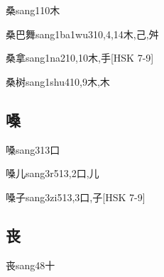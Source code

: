 \begin{EntryWithPhonetic}{桑}{sang1}{10}{⽊}
\end{EntryWithPhonetic}

\begin{EntryWithPhonetic}{桑巴舞}{sang1ba1wu3}{10,4,14}{⽊,⼰,⾇}
\end{EntryWithPhonetic}

\begin{EntryWithPhonetic}{桑拿}{sang1na2}{10,10}{⽊,⼿}[HSK 7-9]
\end{EntryWithPhonetic}

\begin{EntryWithPhonetic}{桑树}{sang1shu4}{10,9}{⽊,⽊}
\end{EntryWithPhonetic}

\subsection*{嗓}

\begin{EntryWithPhonetic}{嗓}{sang3}{13}{⼝}
\end{EntryWithPhonetic}

\begin{EntryWithPhonetic}{嗓儿}{sang3r5}{13,2}{⼝,⼉}
\end{EntryWithPhonetic}

\begin{EntryWithPhonetic}{嗓子}{sang3zi5}{13,3}{⼝,⼦}[HSK 7-9]
\end{EntryWithPhonetic}

\subsection*{丧}

\begin{EntryWithPhonetic}{丧}{sang4}{8}{⼗}
\end{EntryWithPhonetic}


